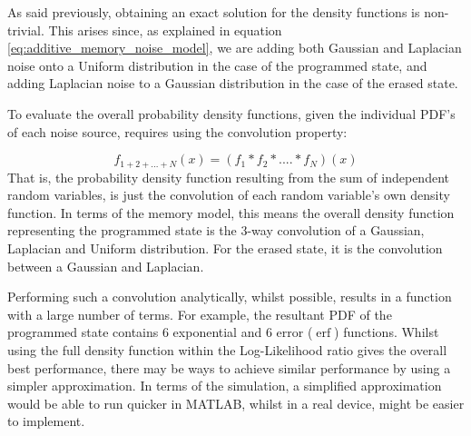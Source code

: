 \documentclass[11pt]{article}
\numberwithin{equation}{subsection}
\DeclareMathOperator\erf{erf}
\begin{document}
As said previously, obtaining an exact solution for the density functions is non-trivial. This arises since, as explained in equation \ref{eq:additive_memory_noise_model}, we are adding both Gaussian and Laplacian noise onto a Uniform distribution in the case of the programmed state, and adding Laplacian noise to a Gaussian distribution in the case of the erased state.

To evaluate the overall probability density functions, given the individual PDF's of each noise source, requires using the convolution property:

\begin{equation} \label{eq:convProperty}
f_{1+2+...+N}(x) = (f_1 \ast f_2 \ast .... \ast f_N)(x)
\end{equation}
That is, the probability density function resulting from the sum of independent random variables, is just the convolution of each random variable's own density function. In terms of the memory model, this means the overall density function representing the programmed state is the 3-way convolution of a Gaussian, Laplacian and Uniform distribution. For the erased state, it is the convolution between a Gaussian and Laplacian. 

Performing such a convolution analytically, whilst possible, results in a function with a large number of terms. For example, the resultant PDF of the programmed state contains 6 exponential and 6 error ($\erf$) functions. Whilst using the full density function within the Log-Likelihood ratio gives the overall best performance, there may be ways to achieve similar performance by using a simpler approximation. In terms of the simulation, a simplified approximation would be able to run quicker in MATLAB, whilst in a real device, might be easier to implement. 
\end{document}
